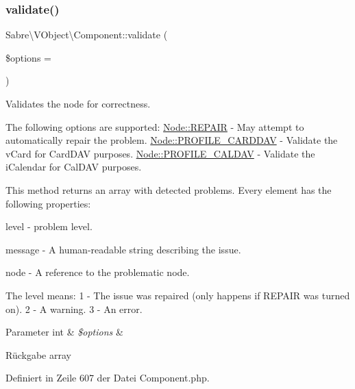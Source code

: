 \subsubsection{\texorpdfstring{validate()}{validate()}}
{\footnotesize\ttfamily Sabre\textbackslash{}\+V\+Object\textbackslash{}\+Component\+::validate (\begin{DoxyParamCaption}\item[{}]{\$options = {} }\end{DoxyParamCaption})}

Validates the node for correctness.

The following options are supported\+: \mbox{\hyperlink{class_sabre_1_1_v_object_1_1_node_ac97a7fb85c1f871523336cd1ec6b29a9}{Node\+::\+R\+E\+P\+A\+IR}} -\/ May attempt to automatically repair the problem. \mbox{\hyperlink{class_sabre_1_1_v_object_1_1_node_a0aac3de0b04bcc44bbf0e22ae47a51c3}{Node\+::\+P\+R\+O\+F\+I\+L\+E\+\_\+\+C\+A\+R\+D\+D\+AV}} -\/ Validate the v\+Card for Card\+D\+AV purposes. \mbox{\hyperlink{class_sabre_1_1_v_object_1_1_node_a1e68f819b7b5537929290e061ffeacc5}{Node\+::\+P\+R\+O\+F\+I\+L\+E\+\_\+\+C\+A\+L\+D\+AV}} -\/ Validate the i\+Calendar for Cal\+D\+AV purposes.

This method returns an array with detected problems. Every element has the following properties\+:


\begin{DoxyItemize}
\item level -\/ problem level.
\item message -\/ A human-\/readable string describing the issue.
\item node -\/ A reference to the problematic node.
\end{DoxyItemize}

The level means\+: 1 -\/ The issue was repaired (only happens if R\+E\+P\+A\+IR was turned on). 2 -\/ A warning. 3 -\/ An error.


\begin{DoxyParams}[1]{Parameter}
int & {\em \$options} & \\
\hline
\end{DoxyParams}
\begin{DoxyReturn}{Rückgabe}
array 
\end{DoxyReturn}


Definiert in Zeile 607 der Datei Component.\+php.

\mbox{\label{class_sabre_1_1_v_object_1_1_component_a9676c9903a859d01ea2edd016e3ffd02}} 
